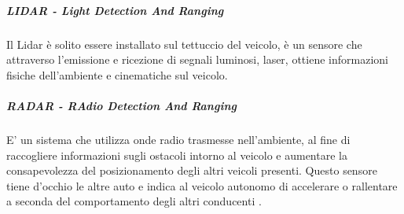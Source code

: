 \documentclass[14pt]{extarticle}
\begin{document}
\subparagraph{LIDAR - Light Detection And Ranging}
Il Lidar è  solito essere installato sul tettuccio del veicolo, è un sensore che attraverso l'emissione e ricezione di segnali luminosi, laser, ottiene informazioni fisiche  dell'ambiente e  cinematiche sul  veicolo.

\subparagraph{RADAR - RAdio Detection And Ranging}
E' un sistema che utilizza onde radio trasmesse nell'ambiente, al fine di raccogliere informazioni sugli  ostacoli intorno al veicolo e aumentare la consapevolezza del  posizionamento degli altri veicoli presenti. Questo sensore tiene
d’occhio le altre auto e indica al veicolo autonomo di accelerare o rallentare
a seconda del comportamento degli altri conducenti \cite{das2018risk}.

\end{document}
